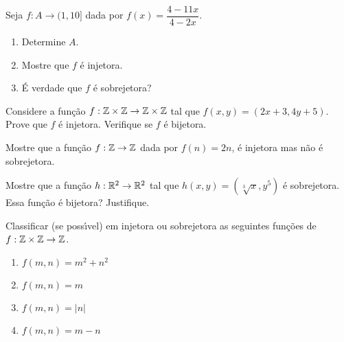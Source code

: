 \documentclass[12pt]{exam}
\begin{document}
    \vspace{.3cm}

    \questao{} Seja $f : A \to (1,10]$ dada por $f(x) = \dfrac{4 - 11x}{4 - 2x}$.
    \begin{enumerate}[label={\alph*})]
        \item Determine $A$.

        \item Mostre que $f$ \'e injetora.

        \item \'E verdade que $f$ \'e sobrejetora?
    \end{enumerate}

    \vspace{.3cm}

    \questao{} Considere a fun{\c c}{\~a}o $f : \mathbb{Z} \times \mathbb{Z} \to \mathbb{Z} \times \mathbb{Z}$ tal que $f(x,y) = (2x + 3, 4y + 5)$. Prove que $f$ {\'e} injetora. Verifique se $f$ {\'e} bijetora.

    \vspace{.3cm}

    \questao{} Mostre que a fun\c{c}\~ao $f : \mathbb{Z} \to \mathbb{Z}$ dada por $f(n) = 2n$, \'e injetora mas n\~ao \'e sobrejetora.

    \vspace{.3cm}

    \questao{} Mostre que a fun\c{c}\~ao $h : \mathbb{R}^2 \to \mathbb{R}^2$ tal que $h(x, y) = (\sqrt[3]{x}, y^5)$ \'e sobrejetora. Essa função é bijetora? Justifique.

    \vspace{.3cm}

    \questao{} Classificar (se poss{\'\i}vel) em injetora ou sobrejetora as seguintes fun{\c c}{\~o}es de $f : \mathbb{Z} \times \mathbb{Z} \to \mathbb{Z}$.

    \begin{multicols}{2}
        \begin{enumerate}[label={\alph*})]
            \item $f(m, n) = m^2 + n^2$

            \item $f(m, n) = m$

            \item $f(m, n) = |n|$

            \item $f(m, n) = m - n$
        \end{enumerate}
    \end{multicols}

    \vspace{.3cm}
\end{document}
